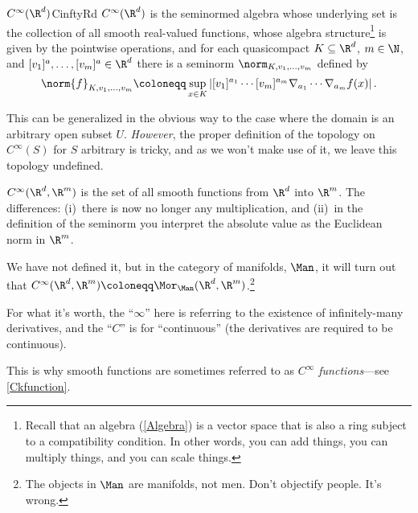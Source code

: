 \begin{dfn}{$C^\infty (\R ^d)$}{CinftyRd}
$C^\infty (\R ^d)$ is the seminormed algebra whose underlying set is the collection of all smooth real-valued functions, whose algebra structure\footnote{Recall that an algebra (\cref{Algebra}) is a vector space that is also a ring subject to a compatibility condition.  In other words, you can add things, you can multiply things, and you can scale things.} is given by the pointwise operations, and for each quasicompact $K\subseteq \R ^d$, $m\in \N$, and $[v_1]^a,\ldots ,[v_m]^a\in \R ^d$ there is a seminorm $\norm_{K,v_1,\ldots ,v_m}$ defined by
\begin{equation*}
\norm{f}_{K,v_1,\ldots ,v_m}\coloneqq \sup _{x\in K}\left| [v_1]^{a_1}\cdots [v_m]^{a_m}\nabla _{a_1}\cdots \nabla _{a_m}f(x)\right| .
\end{equation*}
\begin{rmk}
	This can be generalized in the obvious way to the case where the domain is an arbitrary open subset $U$.  \emph{However}, the proper definition of the topology on $C^{\infty}(S)$ for $S$ arbitrary is tricky, and as we won't make use of it, we leave this topology undefined.
\end{rmk}
\begin{rmk}
$C ^{\infty}(\R ^d,\R ^m)$ is the set of all smooth functions from $\R ^d$ into $\R ^m$.  The differences:  (i)~there is now no longer any multiplication, and (ii)~in the definition of the seminorm you interpret the absolute value as the Euclidean norm in $\R ^m$.
\end{rmk}
\begin{rmk}
We have not defined it, but in the category of manifolds, $\Man$, it will turn out that $C^\infty (\R ^d,\R ^m)\coloneqq \Mor _{\Man}(\R ^d,\R ^m)$.\footnote{The objects in $\Man$ are manifolds, not men.  Don't objectify people.  It's wrong.}
\end{rmk}
\begin{rmk}
For what it's worth, the ``$\infty$'' here is referring to the existence of infinitely-many derivatives, and the ``$C$'' is for ``continuous'' (the derivatives are required to be continuous).
\end{rmk}
\begin{rmk}
This is why smooth functions are sometimes referred to as \emph{$C^{\infty}$ functions}---see \cref{Ckfunction}.
\end{rmk}
\end{dfn}
